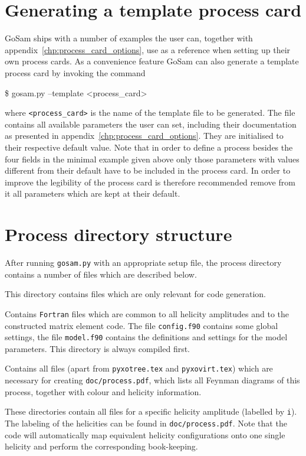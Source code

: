 \documentclass[11pt,a4paper]{refrep}
\newcommand{\gosam}{{\sc GoSam}\xspace}
\begin{document}
\section{Generating a template process card}
\gosam ships with a number of examples the user can, together with appendix~\ref{chp:process_card_options}, use as a reference when setting up their own process cards. As a convenience feature \gosam can also generate a template process card by invoking the command
\begin{example}
\$ gosam.py --template <process\_card>
\end{example}
where \texttt{<process\_card>} is the name of the template file to be generated. The file contains all available parameters the user can set, including their documentation as presented in appendix~\ref{chp:process_card_options}. They are initialised to their respective default value. Note that in order to define a process besides the four fields in the minimal example given above only those parameters with values different from their default have to be included in the process card. In order to improve the legibility of the process card is therefore recommended remove from it all parameters which are kept at their default.


\section{Process directory structure}
After running \texttt{gosam.py} with an appropriate setup file, the
process directory contains a number of files which are described below.

 This directory contains files which are only
relevant for code ge\-ne\-ration.

 Contains {\tt Fortran} files which are common to all helicity
amplitudes and to the constructed matrix element code. 
The file {\tt config.f90} contains some global  settings, the file {\tt model.f90}
contains the definitions and settings for the model parameters.
This directory is always compiled first.

 Contains all files (apart from
\texttt{pyxotree.tex} and \texttt{pyxovirt.tex}) which are
necessary for creating
\texttt{doc/process.pdf}, which lists all Feynman diagrams of this process, 
together with colour and helicity information.

 These directories contain all files for a specific
helicity amplitude (labelled by {\tt i}). The labeling of the helicities can be found in
\texttt{doc/process.pdf}. 
Note that the code will automatically map equivalent helicity 
configurations onto one single helicity and perform the corresponding book-keeping.
\end{document}
